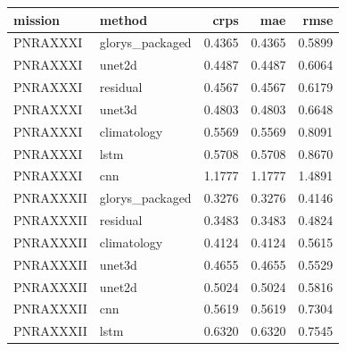 \begin{tabular}{llrrr}
\toprule
mission & method & crps & mae & rmse \\
\midrule
PNRAXXXI & glorys_packaged & 0.4365 & 0.4365 & 0.5899 \\
PNRAXXXI & unet2d & 0.4487 & 0.4487 & 0.6064 \\
PNRAXXXI & residual & 0.4567 & 0.4567 & 0.6179 \\
PNRAXXXI & unet3d & 0.4803 & 0.4803 & 0.6648 \\
PNRAXXXI & climatology & 0.5569 & 0.5569 & 0.8091 \\
PNRAXXXI & lstm & 0.5708 & 0.5708 & 0.8670 \\
PNRAXXXI & cnn & 1.1777 & 1.1777 & 1.4891 \\
PNRAXXXII & glorys_packaged & 0.3276 & 0.3276 & 0.4146 \\
PNRAXXXII & residual & 0.3483 & 0.3483 & 0.4824 \\
PNRAXXXII & climatology & 0.4124 & 0.4124 & 0.5615 \\
PNRAXXXII & unet3d & 0.4655 & 0.4655 & 0.5529 \\
PNRAXXXII & unet2d & 0.5024 & 0.5024 & 0.5816 \\
PNRAXXXII & cnn & 0.5619 & 0.5619 & 0.7304 \\
PNRAXXXII & lstm & 0.6320 & 0.6320 & 0.7545 \\
\bottomrule
\end{tabular}
